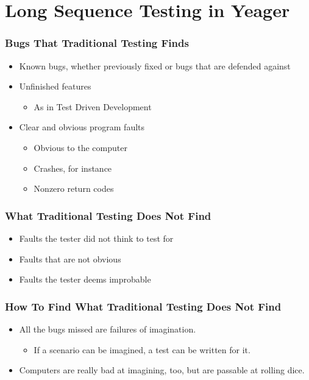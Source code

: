 \section{Long Sequence Testing in Yeager}

\begin{frame}
  \frametitle{Bugs That Traditional Testing Finds}
  \begin{itemize}
    \item Known bugs, whether previously fixed or bugs that are defended against
    \item Unfinished features
    \begin{itemize}
      \item As in Test Driven Development
    \end{itemize}
    \item Clear and obvious program faults
    \begin{itemize}
      \item Obvious to the computer
      \item Crashes, for instance
      \item Nonzero return codes
    \end{itemize}
  \end{itemize}
\end{frame}

\begin{frame}
  \frametitle{What Traditional Testing Does Not Find}
  \begin{itemize}
    \item Faults the tester did not think to test for
    \item Faults that are not obvious
    \item Faults the tester deems improbable
  \end{itemize}
\end{frame}

\begin{frame}
  \frametitle{How To Find What Traditional Testing Does Not Find}
  \begin{itemize}
    \item All the bugs missed are failures of imagination.
    \begin{itemize}
      \item If a scenario can be imagined, a test can be written for it.
    \end{itemize}
    \item Computers are really bad at imagining, too, but are passable at rolling dice.
  \end{itemize}
\end{frame}

